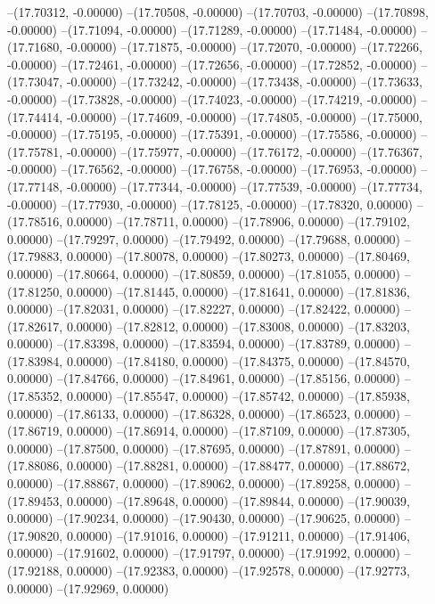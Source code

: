 --(17.70312, -0.00000)
--(17.70508, -0.00000)
--(17.70703, -0.00000)
--(17.70898, -0.00000)
--(17.71094, -0.00000)
--(17.71289, -0.00000)
--(17.71484, -0.00000)
--(17.71680, -0.00000)
--(17.71875, -0.00000)
--(17.72070, -0.00000)
--(17.72266, -0.00000)
--(17.72461, -0.00000)
--(17.72656, -0.00000)
--(17.72852, -0.00000)
--(17.73047, -0.00000)
--(17.73242, -0.00000)
--(17.73438, -0.00000)
--(17.73633, -0.00000)
--(17.73828, -0.00000)
--(17.74023, -0.00000)
--(17.74219, -0.00000)
--(17.74414, -0.00000)
--(17.74609, -0.00000)
--(17.74805, -0.00000)
--(17.75000, -0.00000)
--(17.75195, -0.00000)
--(17.75391, -0.00000)
--(17.75586, -0.00000)
--(17.75781, -0.00000)
--(17.75977, -0.00000)
--(17.76172, -0.00000)
--(17.76367, -0.00000)
--(17.76562, -0.00000)
--(17.76758, -0.00000)
--(17.76953, -0.00000)
--(17.77148, -0.00000)
--(17.77344, -0.00000)
--(17.77539, -0.00000)
--(17.77734, -0.00000)
--(17.77930, -0.00000)
--(17.78125, -0.00000)
--(17.78320, 0.00000)
--(17.78516, 0.00000)
--(17.78711, 0.00000)
--(17.78906, 0.00000)
--(17.79102, 0.00000)
--(17.79297, 0.00000)
--(17.79492, 0.00000)
--(17.79688, 0.00000)
--(17.79883, 0.00000)
--(17.80078, 0.00000)
--(17.80273, 0.00000)
--(17.80469, 0.00000)
--(17.80664, 0.00000)
--(17.80859, 0.00000)
--(17.81055, 0.00000)
--(17.81250, 0.00000)
--(17.81445, 0.00000)
--(17.81641, 0.00000)
--(17.81836, 0.00000)
--(17.82031, 0.00000)
--(17.82227, 0.00000)
--(17.82422, 0.00000)
--(17.82617, 0.00000)
--(17.82812, 0.00000)
--(17.83008, 0.00000)
--(17.83203, 0.00000)
--(17.83398, 0.00000)
--(17.83594, 0.00000)
--(17.83789, 0.00000)
--(17.83984, 0.00000)
--(17.84180, 0.00000)
--(17.84375, 0.00000)
--(17.84570, 0.00000)
--(17.84766, 0.00000)
--(17.84961, 0.00000)
--(17.85156, 0.00000)
--(17.85352, 0.00000)
--(17.85547, 0.00000)
--(17.85742, 0.00000)
--(17.85938, 0.00000)
--(17.86133, 0.00000)
--(17.86328, 0.00000)
--(17.86523, 0.00000)
--(17.86719, 0.00000)
--(17.86914, 0.00000)
--(17.87109, 0.00000)
--(17.87305, 0.00000)
--(17.87500, 0.00000)
--(17.87695, 0.00000)
--(17.87891, 0.00000)
--(17.88086, 0.00000)
--(17.88281, 0.00000)
--(17.88477, 0.00000)
--(17.88672, 0.00000)
--(17.88867, 0.00000)
--(17.89062, 0.00000)
--(17.89258, 0.00000)
--(17.89453, 0.00000)
--(17.89648, 0.00000)
--(17.89844, 0.00000)
--(17.90039, 0.00000)
--(17.90234, 0.00000)
--(17.90430, 0.00000)
--(17.90625, 0.00000)
--(17.90820, 0.00000)
--(17.91016, 0.00000)
--(17.91211, 0.00000)
--(17.91406, 0.00000)
--(17.91602, 0.00000)
--(17.91797, 0.00000)
--(17.91992, 0.00000)
--(17.92188, 0.00000)
--(17.92383, 0.00000)
--(17.92578, 0.00000)
--(17.92773, 0.00000)
--(17.92969, 0.00000)

